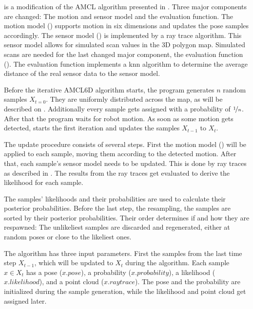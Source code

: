 \documentclass[Thesis.tex]{subfiles}
\begin{document}
%
 is a modification of the \gls{AMCL} algorithm presented in \cite{ThrunBurgardFox:2005}. Three major components are changed: The motion and sensor model and the evaluation function. The motion model () supports motion in six dimensions and updates the pose samples accordingly. The sensor model () is implemented by a ray trace algorithm. This sensor model allows for simulated scan values in the 3D polygon map. Simulated scans are needed for the last changed major component, the evaluation function (). The evaluation function implements a \gls{knn} algorithm to determine the average distance of the real sensor data to the sensor model.

Before the iterative \gls{AMCL6D} algorithm starts, the program generates $n$ random samples $X_{t=0}$. They are uniformly distributed across the map, as will be described on . Additionally every sample gets assigned with a probability of $\nicefrac{1}{n}$.  After that the program waits for robot motion. As soon as some motion gets detected,  starts the first iteration and updates the samples $X_{t-1}$ to $X_{t}$.

The update procedure consists of several steps. First the motion model () will be applied to each sample, moving them according to the detected motion. After that, each sample's sensor model needs to be updated. This is done by ray traces as described in . The results from the ray traces get evaluated to derive the likelihood for each sample.

The samples' likelihoods and their probabilities are used to calculate their posterior probabilities. Before the last step, the resampling, the samples are sorted by their posterior probabilities. Their order determines if and how they are respawned: The unlikeliest samples are discarded and regenerated, either at random poses or close to the likeliest ones.

\smallskip

The algorithm has three input parameters. First the samples from the last time step $X_{t-1}$, which will be updated to $X_t$ during the algorithm. Each sample $x \in X_t$ has a pose ($x.pose$), a probability ($x.probability$), a likelihood ($x.likelihood$), and a point cloud ($x.raytrace$). The pose and the probability are initialized during the sample generation, while the likelihood and point cloud get assigned later.
\end{document}
